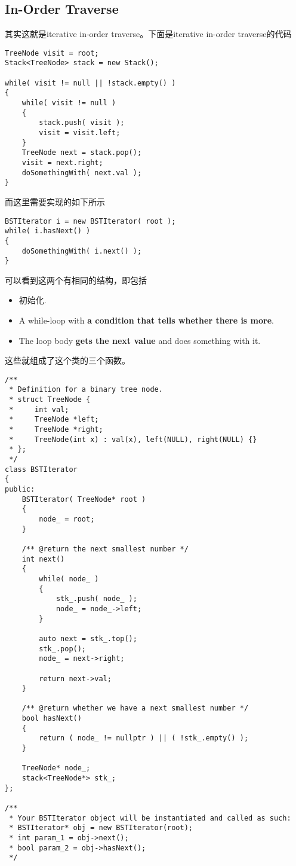 \subsection{In-Order Traverse}
\begin{CJK*}{UTF8}{gbsn}
其实这就是iterative in-order traverse。下面是iterative in-order traverse的代码
\begin{lstlisting}[style=customc]
TreeNode visit = root;
Stack<TreeNode> stack = new Stack();

while( visit != null || !stack.empty() )
{
    while( visit != null )
    {
        stack.push( visit );
        visit = visit.left;
    }
    TreeNode next = stack.pop();
    visit = next.right;
    doSomethingWith( next.val );
}
\end{lstlisting}
而这里需要实现的如下所示
\begin{lstlisting}[style=customc]
BSTIterator i = new BSTIterator( root );
while( i.hasNext() )
{
    doSomethingWith( i.next() );
}
\end{lstlisting}
可以看到这两个有相同的结构，即包括
\begin{itemize}
\item 初始化.
\item A while-loop with \textbf{a condition that tells whether there is more}.
\item The loop body \textbf{gets the next value} and does something with it.
\end{itemize}
这些就组成了这个类的三个函数。
\end{CJK*}
\setcounter{lstlisting}{0}
\begin{lstlisting}[style=customc, caption={Class Definition}]
/**
 * Definition for a binary tree node.
 * struct TreeNode {
 *     int val;
 *     TreeNode *left;
 *     TreeNode *right;
 *     TreeNode(int x) : val(x), left(NULL), right(NULL) {}
 * };
 */
class BSTIterator
{
public:
    BSTIterator( TreeNode* root )
    {
        node_ = root;
    }

    /** @return the next smallest number */
    int next()
    {
        while( node_ )
        {
            stk_.push( node_ );
            node_ = node_->left;
        }

        auto next = stk_.top();
        stk_.pop();
        node_ = next->right;

        return next->val;
    }

    /** @return whether we have a next smallest number */
    bool hasNext()
    {
        return ( node_ != nullptr ) || ( !stk_.empty() );
    }

    TreeNode* node_;
    stack<TreeNode*> stk_;
};

/**
 * Your BSTIterator object will be instantiated and called as such:
 * BSTIterator* obj = new BSTIterator(root);
 * int param_1 = obj->next();
 * bool param_2 = obj->hasNext();
 */
\end{lstlisting}